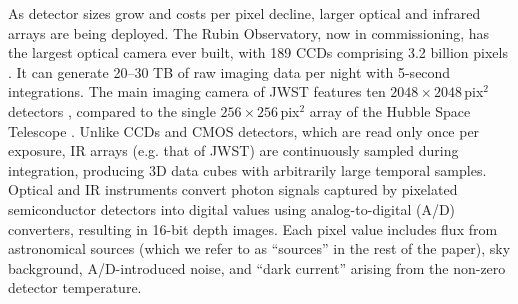 As detector sizes grow and costs per pixel decline, larger optical and infrared arrays are being deployed. The Rubin Observatory, now in commissioning, has the largest optical camera ever built, with 189 CCDs comprising 3.2 billion pixels \citep{2010SPIE.7735E..0JK}. It can generate 20--30 TB of raw imaging data per night with 5-second integrations. The main imaging camera of JWST features ten $2048\times2048$\,pix$^{2}$ detectors \citep{2023PASP..135f8001G}, compared to the single $256\times256$\,pix$^{2}$ array of the Hubble Space Telescope \citep{1998ApJ...492L..95T}. Unlike CCDs and CMOS detectors, which are read only once per exposure, IR arrays (e.g. that of JWST) are continuously sampled during integration, producing 3D data cubes with arbitrarily large temporal samples. Optical and IR instruments convert photon signals captured by pixelated semiconductor detectors into digital values using analog-to-digital (A/D) converters, resulting in 16-bit depth images. Each pixel value includes flux from astronomical sources (which we refer to as ``sources'' in the rest of the paper), sky background, A/D-introduced noise, and ``dark current'' arising from the non-zero detector temperature.

